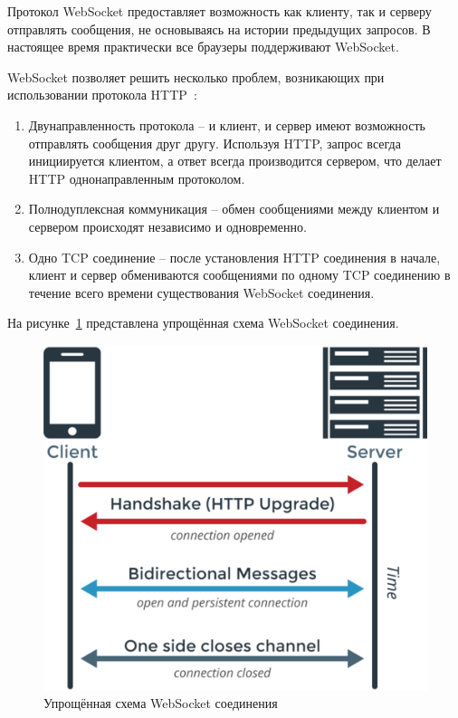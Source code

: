 Протокол WebSocket предоставляет возможность как клиенту, так и серверу отправлять сообщения, не основываясь на истории предыдущих запросов. В настоящее время практически все браузеры поддерживают WebSocket.

WebSocket позволяет решить несколько проблем, возникающих при использовании протокола HTTP~\cite{http_websockets}:

\begin{enumerate}
  \item Двунаправленность протокола -- и клиент, и сервер имеют возможность отправлять сообщения друг другу. Используя HTTP, запрос всегда инициируется клиентом, а ответ всегда производится сервером, что делает HTTP однонаправленным протоколом.
  \item Полнодуплексная коммуникация -- обмен сообщениями между клиентом и сервером происходят независимо и одновременно.
  \item Одно TCP соединение -- после установления HTTP соединения в начале, клиент и сервер обмениваются сообщениями по одному TCP соединению в течение всего времени существования WebSocket соединения. 
\end{enumerate}

На рисунке~\ref{img:webSocket__schema} представлена упрощённая схема WebSocket соединения.

\begin{figure}[H]
  \centering
  \includegraphics[height=0.2\textheight]{assets/images/theoretical2/webSocket_schema.png}
  \caption{Упрощённая схема WebSocket соединения}
  \label{img:webSocket__schema}
\end{figure}

